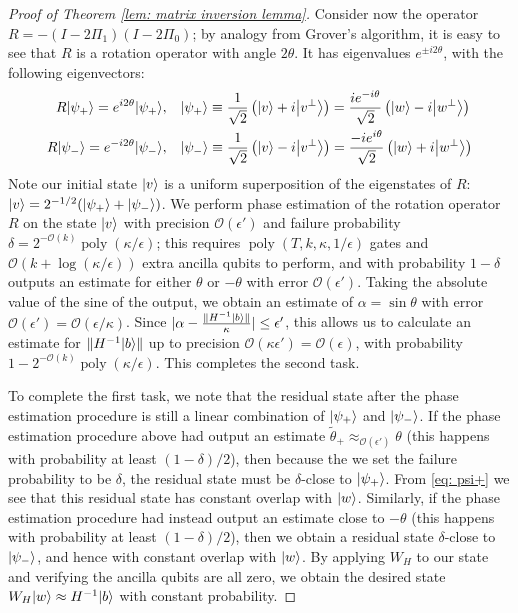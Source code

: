 \documentclass[11pt]{article}
\theoremstyle{definition}
\theoremstyle{remark}
\newcommand\bigoh{\mathcal{O}}
\DeclareMathOperator{\poly}{poly}
\begin{document}
\begin{proof}[Proof of Theorem \ref{lem: matrix inversion lemma}]
Consider now the operator $R=-(I-2\Pi_1)(I-2\Pi_0)$; by analogy from Grover's algorithm, it is easy to see that $R$ is a rotation operator with angle $2\theta$. It has eigenvalues $e^{\pm i2\theta}$, with the following eigenvectors:
\begin{align}
R{\left\vert{\psi_+}\right\rangle} = e^{i2\theta}{\left\vert{\psi_+}\right\rangle},&\quad {\left\vert{\psi_+}\right\rangle} \equiv \frac{1}{\sqrt{2}}\left({\left\vert{v}\right\rangle} + i {\left\vert{v^\perp}\right\rangle} \right) = \frac{ie^{-i\theta}}{\sqrt{2}}\left({\left\vert{w}\right\rangle} - i{\left\vert{w^\perp}\right\rangle} \right) \label{eq: psi+} \\
R{\left\vert{\psi_-}\right\rangle} = e^{-i2\theta}{\left\vert{\psi_-}\right\rangle},&\quad {\left\vert{\psi_-}\right\rangle} \equiv \frac{1}{\sqrt{2}}\left({\left\vert{v}\right\rangle} - i {\left\vert{v^\perp}\right\rangle} \right) = \frac{-ie^{i\theta}}{\sqrt{2}}\left({\left\vert{w}\right\rangle} + i{\left\vert{w^\perp}\right\rangle} \right)
\end{align}
Note our initial state ${\left\vert{v}\right\rangle}$ is a uniform superposition of the eigenstates of $R$: ${\left\vert{v}\right\rangle} = 2^{-1/2} ({\left\vert{\psi_+}\right\rangle} + {\left\vert{\psi_-}\right\rangle})$. We perform phase estimation of the rotation operator $R$ on the state ${\left\vert{v}\right\rangle}$ with precision $\bigoh(\epsilon')$ and failure probability $\delta = 2^{-\bigoh(k)}\poly(\kappa/\epsilon)$; this requires $\poly(T,k,\kappa,1/\epsilon)$ gates and $\bigoh(k+\log(\kappa/\epsilon))$ extra ancilla qubits to perform, and with probability $1-\delta$ outputs an estimate for either $\theta$ or $-\theta$ with error $\bigoh(\epsilon')$. Taking the absolute value of the sine of the output, we obtain an estimate of $\alpha = \sin \theta$ with error $\bigoh(\epsilon') = \bigoh(\epsilon/\kappa)$. Since $|\alpha - \frac{\|H^{-1}{\left\vert{b}\right\rangle}\|}{\kappa}| \le \epsilon'$, this allows us to calculate an estimate for $\|H^{-1}{\left\vert{b}\right\rangle}\|$ up to precision $\mathcal{O}(\kappa \epsilon') = \mathcal{O}(\epsilon)$, with probability $1-2^{-\bigoh(k)}\poly(\kappa/\epsilon)$. This completes the second task.

To complete the first task, we note that the residual state after the phase estimation procedure is still a linear combination of ${\left\vert{\psi_+}\right\rangle}$ and ${\left\vert{\psi_-}\right\rangle}$. If the phase estimation procedure above had output an estimate $\tilde{\theta}_+ \approx_{\bigoh(\epsilon')} \theta$ (this happens with probability at least $(1-\delta)/2$), then because the we set the failure probability to be $\delta$, the residual state must be $\delta$-close to ${\left\vert{\psi_+}\right\rangle}$.  From \eqref{eq: psi+} we see that this residual state has constant overlap with ${\left\vert{w}\right\rangle}$. Similarly, if the phase estimation procedure had instead output an estimate close to $-\theta$ (this happens with probability at least $(1-\delta)/2$), then we obtain a residual state $\delta$-close to ${\left\vert{\psi_-}\right\rangle}$, and hence with constant overlap with ${\left\vert{w}\right\rangle}$. By applying $W_H$ to our state and verifying the ancilla qubits are all zero, we obtain the desired state $W_H{\left\vert{w}\right\rangle}\approx H^{-1}{\left\vert{b}\right\rangle}$ with constant probability.


\end{proof}
\end{document}
